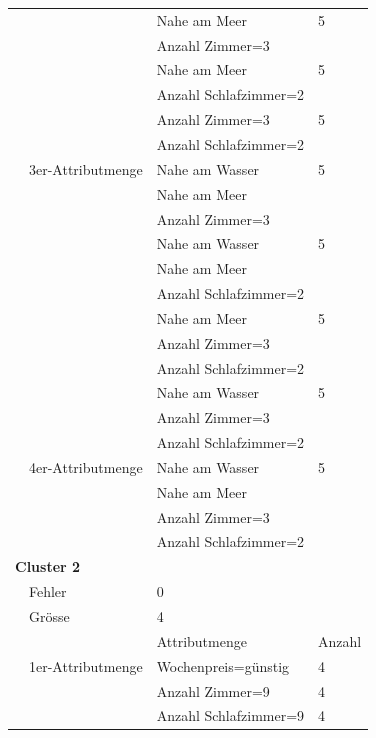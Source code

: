 \begin{longtable}{ | l | l | l | l |}
	& & \tabitem Nahe am Meer & 5 \\
	& & \tabitem Anzahl Zimmer=3 & \\ \cline{3-4} 
	& & \tabitem Nahe am Meer & 5 \\
	& & \tabitem Anzahl Schlafzimmer=2 & \\ \cline{3-4} 
	
	& & \tabitem Anzahl Zimmer=3 & 5 \\
	& & \tabitem Anzahl Schlafzimmer=2 & \\ \cline{2-4} 
	
	& 3er-Attributmenge & \tabitem Nahe am Wasser & 5 \\
	& & \tabitem Nahe am Meer & \\ 
	& & \tabitem Anzahl Zimmer=3 & \\ \cline{3-4} 
	& & \tabitem Nahe am Wasser & 5 \\
	& & \tabitem Nahe am Meer & \\ 
	& & \tabitem Anzahl Schlafzimmer=2 & \\ \cline{3-4}
	& & \tabitem Nahe am Meer & 5 \\
	& & \tabitem Anzahl Zimmer=3 & \\ 
	& & \tabitem Anzahl Schlafzimmer=2 & \\ \cline{3-4}
	& & \tabitem Nahe am Wasser & 5 \\
	& & \tabitem Anzahl Zimmer=3 & \\ 
	& & \tabitem Anzahl Schlafzimmer=2 & \\ \cline{2-4}
	
	& 4er-Attributmenge & \tabitem Nahe am Wasser & 5 \\
	& & \tabitem Nahe am Meer & \\ 
	& & \tabitem Anzahl Zimmer=3 & \\ 
	& & \tabitem Anzahl Schlafzimmer=2 & \\ \hline
	
	\multicolumn{4}{|l|}{\textbf{Cluster 2}} \\ \cline{2-4} 
	& Fehler & \multicolumn{2}{|l|}{0} \\ \cline{2-4} 
	& Grösse & \multicolumn{2}{|l|}{4} \\ \cline{2-4} 
	& & Attributmenge & Anzahl \\ \cline{2-4} 
	
	& 1er-Attributmenge & \tabitem Wochenpreis=günstig & 4 \\ \cline{3-4}
	& & \tabitem Anzahl Zimmer=9 & 4 \\ \cline{3-4}
	& & \tabitem Anzahl Schlafzimmer=9 & 4 \\ \cline{2-4} 
	

\end{longtable}
